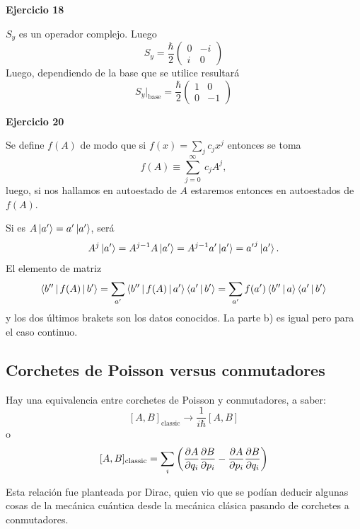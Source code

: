 \documentclass[10pt,oneside]{CBFT_book}
\begin{document}
\begin{ejemplo}{\bf Ejercicio 18}

$S_y$ es un operador complejo. Luego
\[
	S_y = \frac{\hbar}{2} \begin{pmatrix}
	                       0 & -i \\
	                       i & 0
	                      \end{pmatrix}
\]
Luego, dependiendo de la base que se utilice resultará
\[
	S_y|_\text{base} = \frac{\hbar}{2} \begin{pmatrix}
	                       1 & 0 \\
	                       0 & -1
	                      \end{pmatrix}
\]
 
\end{ejemplo}

\begin{ejemplo}{\bf Ejercicio 20}

Se define $f(A)$ de modo que si $f(x) = \sum_j c_j x^j$ entonces se toma
\[
	f(A) \equiv \sum_{j=0}^\infty \: c_j A^j,
\]
luego, si nos hallamos en autoestado de $A$ estaremos entonces en autoestados de $f(A)$.

Si es $A\Ket{a'} = a' \Ket{a'}$, será
\[
	A^j\Ket{a'} = A^{j-1}A\Ket{a'} = A^{j-1}a'\Ket{a'} = {a'}^j\Ket{a'}.
\]
El elemento de matriz
\[
	\Braket{b''|f(A)|b'} =  \sum_{a'} \Braket{b''|f(A)|a'} \Braket{a'|b'} =
	\sum_{a'} f(a')\Braket{b''|a} \Braket{a'|b'}
\]
y los dos últimos brakets son los datos conocidos.
La parte b) es igual pero para el caso continuo.
 
\end{ejemplo}

\subsection{Corchetes de Poisson versus conmutadores}

Hay una equivalencia entre corchetes de Poisson y conmutadores, a saber:
\[
	[A, B]_{\text{classic}} \longrightarrow \frac{1}{i\hbar}[A,B]
\]
o
\[
	[A, B]_{\text{classic}} = \sum_i 
	\left( \frac{\partial^{\hspace{-0.05em}} {A}}{\partial {q_i}^{\hspace{-0.05em}}} \frac{\partial^{\hspace{-0.05em}} {B}}{\partial {p_i}^{\hspace{-0.05em}}} - \frac{\partial^{\hspace{-0.05em}} {A}}{\partial {p_i}^{\hspace{-0.05em}}} \frac{\partial^{\hspace{-0.05em}} {B}}{\partial {q_i}^{\hspace{-0.05em}}} \right)
\]

Esta relación fue planteada por Dirac, quien vio que se podían deducir algunas
cosas de la mecánica cuántica desde la mecánica clásica pasando de corchetes
a conmutadores.

\end{document}
